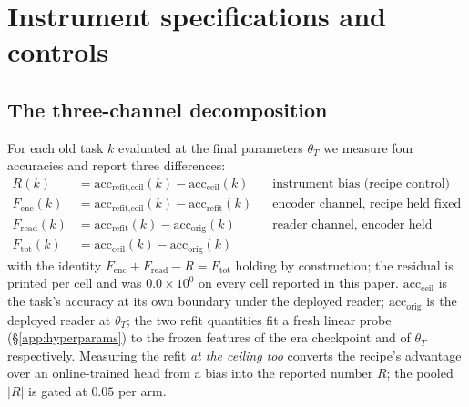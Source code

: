 \appendix

\section{Instrument specifications and controls}
\label{app:instrument}

\subsection{The three-channel decomposition}

For each old task $k$ evaluated at the final parameters $\theta_T$ we measure
four accuracies and report three differences:
\begin{align}
  R(k)            &= \mathrm{acc}_{\text{refit,ceil}}(k) - \mathrm{acc}_{\text{ceil}}(k)
                     &&\text{instrument bias (recipe control)} \\
  F_{\mathrm{enc}}(k)  &= \mathrm{acc}_{\text{refit,ceil}}(k) - \mathrm{acc}_{\text{refit}}(k)
                     &&\text{encoder channel, recipe held fixed} \\
  F_{\mathrm{read}}(k) &= \mathrm{acc}_{\text{refit}}(k) - \mathrm{acc}_{\text{orig}}(k)
                     &&\text{reader channel, encoder held fixed} \\
  F_{\mathrm{tot}}(k)  &= \mathrm{acc}_{\text{ceil}}(k) - \mathrm{acc}_{\text{orig}}(k)
\end{align}
with the identity $F_{\mathrm{enc}} + F_{\mathrm{read}} - R = F_{\mathrm{tot}}$
holding by construction; the residual is printed per cell and was
$0.0\times10^{0}$ on every cell reported in this paper.
$\mathrm{acc}_{\text{ceil}}$ is the task's accuracy at its own boundary under the
deployed reader; $\mathrm{acc}_{\text{orig}}$ is the deployed reader at
$\theta_T$; the two refit quantities fit a fresh linear probe
(\S\ref{app:hyperparams}) to the frozen features of the era checkpoint and of
$\theta_T$ respectively. Measuring the refit \emph{at the ceiling too} converts
the recipe's advantage over an online-trained head from a bias into the
reported number $R$; the pooled $|R|$ is gated at $0.05$ per arm.

